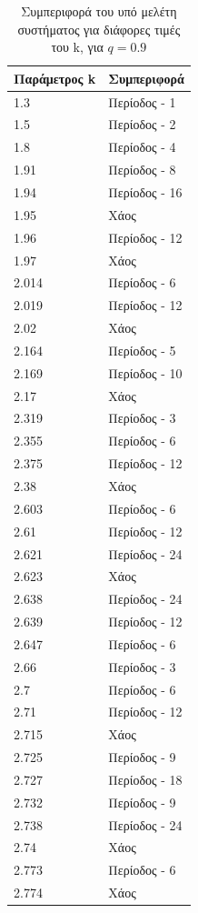 \begin{table}[ht]
	\centering
	\caption{ Συμπεριφορά του υπό μελέτη συστήματος για διάφορες τιμές του k, για $q=0.9$ }
	\label{tab:abc13}
	\begin{tabular}{l | l}
		Παράμετρος k & Συμπεριφορά \\
		\hline
		1.3 &  Περίοδος -  1 \\
		1.5 &  Περίοδος -  2 \\
		1.8& Περίοδος -  4 \\
		1.91& Περίοδος -  8 \\
		1.94& Περίοδος -  16 \\
		1.95 & Xάος \\
		1.96& Περίοδος - 12 \\
		1.97& Xάος \\
		2.014& Περίοδος - 6 \\
		2.019& Περίοδος - 12\\
		2.02& Χάος \\
		2.164& Περίοδος - 5 \\
		2.169 &  Περίοδος - 10  \\
		2.17 &  Χάος \\
		2.319& Περίοδος - 3 \\
		2.355 &  Περίοδος - 6  \\
		2.375 &  Περίοδος -  12 \\
		2.38 &Χάος \\
		2.603 & Περίοδος - 6\\
		2.61& Περίοδος - 12\\
		2.621& Περίοδος - 24\\
		2.623& Xάος\\
		2.638 & Περίοδος - 24\\
		2.639& Περίοδος - 12\\
		2.647& Περίοδος - 6\\
		2.66 & Περίοδος - 3\\
		2.7 & Περίοδος -  6\\
		2.71 & Περίοδος -  12\\
		2.715 & Xάος\\
		2.725 & Περίοδος - 9\\
		2.727 & Περίοδος -  18\\
		2.732 & Περίοδος -  9\\
		2.738 & Περίοδος -  24\\
		2.74& Χάος\\
		2.773 & Περίοδος -  6\\
		2.774& Χάος\\
		
	\end{tabular}
	
\end{table}


